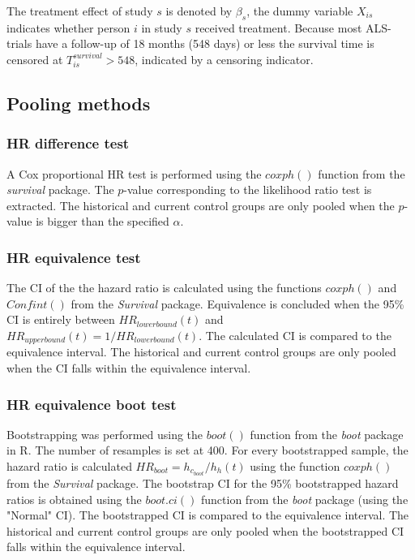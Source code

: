 \documentclass[Royal,sagev,times]{sagej}
\begin{document}
The treatment effect of study $s$ is denoted by $\beta_s$, the dummy variable $X_{is}$ indicates whether person $i$ in study $s$ received treatment. Because most ALS-trials have a follow-up of 18 months (548 days) or less \cite{van2019} the survival time is censored at $T^{survival}_{is}>548$, indicated by a censoring indicator.

\subsection{Pooling methods}
\subsubsection{HR difference test}
A Cox proportional HR test is performed using the $coxph()$ function from the \textit{survival} package\cite{survivalpackage}. The $p$-value corresponding to the likelihood ratio test is extracted.
The historical and current control groups are only pooled when the $p$-value is bigger than the specified $\alpha$.

\subsubsection{HR equivalence test}
The CI of the the hazard ratio is calculated using the functions $coxph()$ and $Confint()$ from the \textit{Survival} package\cite{survivalpackage}. Equivalence is concluded when the 95\% CI is entirely between $HR_{lower bound}(t)$ and $HR_{upper bound}(t)=1/HR_{lower bound}(t)$.\cite{Silva2009}
The calculated CI is compared to the equivalence interval. The historical and current control groups are only pooled when the CI falls within the equivalence interval.  

\subsubsection{HR equivalence boot test}
Bootstrapping was performed using the $boot()$ function from the \textit{boot} package\cite{bootpackage} in R. The number of resamples is set at 400. For every bootstrapped sample, the hazard ratio is calculated $HR_{boot} = h_{c_{boot}}/h_{h}(t)$ using the function $coxph()$ from the \textit{Survival} package\cite{survivalpackage}. The bootstrap CI for the 95\% bootstrapped hazard ratios is obtained using the $boot.ci()$ function from the \textit{boot}\cite{bootpackage} package (using the "Normal" CI). 
The bootstrapped CI is compared to the equivalence interval. The historical and current control groups are only pooled when the bootstrapped CI falls within the equivalence interval. 
\end{document}
